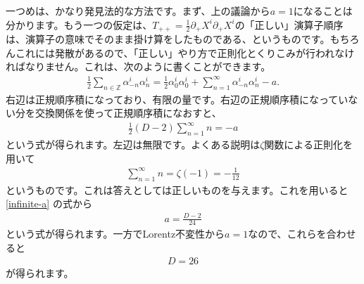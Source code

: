 \documentclass[report,paper=a4, fontsize=12pt, line_length=16cm, number_of_lines=33,dvipdfmx]{jlreq}
\numberwithin{equation}{chapter}
\numberwithin{equation}{section}
\newcommand{\Zb}{\mathbb{Z}}
\newcommand{\del}{\partial}
\begin{document}
一つめは、かなり発見法的な方法です。まず、上の議論から$a=1$になることは分かります。もう一つの仮定は、$T_{++}=\frac12 \del_{+}X^i\del_{+}X^i$の「正しい」演算子順序は、演算子の意味でそのまま掛け算をしたものである、というものです。もちろんこれには発散があるので、「正しい」やり方で正則化とくりこみが行われなければなりません。これは、次のように書くことができます。
\begin{align}
\frac12\sum_{n\in \Zb}\alpha^i_{-n}\alpha^i_{n}=\frac12 \alpha^i_0\alpha^i_0+\sum_{n=1}^{\infty}\alpha^i_{-n}\alpha^i_{n}-a.
\end{align}
右辺は正規順序積になっており、有限の量です。右辺の正規順序積になっていない分を交換関係を使って正規順序積になおすと、
\begin{align}
\frac12(D-2)\sum_{n=1}^{\infty} n=-a\label{infinite-a}
\end{align}
という式が得られます。左辺は無限です。よくある説明は$\zeta$関数による正則化を用いて
\begin{align}
\sum_{n=1}^{\infty}n=\zeta(-1)=-\frac{1}{12}
\end{align}
というものです。これは答えとしては正しいものを与えます。これを用いると\eqref{infinite-a}
の式から
\begin{align}
a=\frac{D-2}{24}
\end{align}
という式が得られます。一方でLorentz不変性から$a=1$なので、これらを合わせると
\begin{align}
D=26
\end{align}
が得られます。
\end{document}
